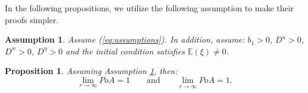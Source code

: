 \documentclass[11pt]{article}
\newtheorem{proposition}{Proposition}
\newtheorem{assumption}{Assumption}
\begin{document}
\noindent In the following propositions, we utilize the following assumption to make their proofs simpler.	
\begin{assumption}\label{assumption}
	Assume (\ref{eq:assumptions}). In addition, assume: $b_1 > 0$, $D^{u} > 0$, $D^w > 0$, $D^{\eta} >0$ and the initial condition satisfies $\mathbb{E}(\xi) \neq 0$.
\end{assumption}

\begin{proposition}
	Assuming Assumption \ref{assumption}, then:
	\begin{equation*}
			\lim_{r \to \infty} PoA = 1 \qquad \text{and} \qquad
			\lim_{\bar{r} \to \infty} PoA = 1.
	\end{equation*}
	\label{prop:r_bar_r}
\end{proposition}
\end{document}
